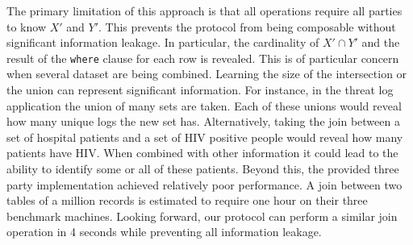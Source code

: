 The primary limitation of this approach is that all operations require all parties to know $X'$ and $Y'$. This prevents the protocol from being composable without significant information leakage. In particular, the cardinality of $X'\cap Y'$ and the result of the \texttt{where} clause for each row is revealed. This is of particular concern when several dataset are being combined. Learning the size of the intersection or the union can represent significant information. For instance, in the threat log application the union of many sets are taken. Each of these unions would reveal how many unique logs the new set has. Alternatively, taking the join between a set of hospital patients and a set of HIV positive people would reveal how many patients have HIV. When combined with other information it could lead to the ability to identify some or all of these patients. Beyond this, the provided three party implementation achieved relatively poor performance. A join between two tables of a million records is estimated to require one hour on their three benchmark machines\cite{LTW13}. Looking forward, our protocol can perform a similar join operation in 4 seconds while preventing all information leakage. 


